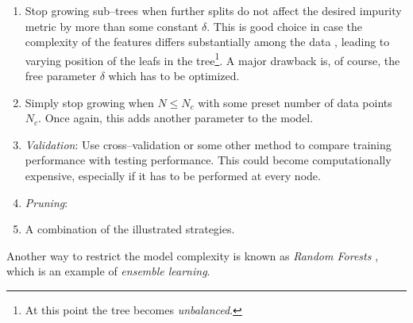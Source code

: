 \begin{enumerate}
\item \label{itm:constant-metric} Stop growing sub--trees when further splits do not affect the desired impurity metric by more than some constant $\delta$. This is good choice in case the complexity of the features differs substantially among the data \citep{duda2001}, leading to varying position of the leafs in the tree\footnote{At this point the tree becomes \emph{unbalanced}.}. A major drawback is, of course, the free parameter $\delta$ which has to be optimized.
\item \label{itm:constant-data-points} Simply stop growing when $N \le N_c$ with some preset number of data points $N_c$. Once again, this adds another parameter to the model.
\item \label{itm:validation} \emph{Validation}: Use cross--validation or some other method to compare training performance with testing performance. This could become computationally expensive, especially if it has to be performed at every node.
\item \label{itm:pruning} \emph{Pruning}: %
\item A combination of the illustrated strategies.
\end{enumerate}







Another way to restrict the model complexity is known as \emph{Random Forests} \citep{breiman2001}, which is an example of \emph{ensemble learning}.


